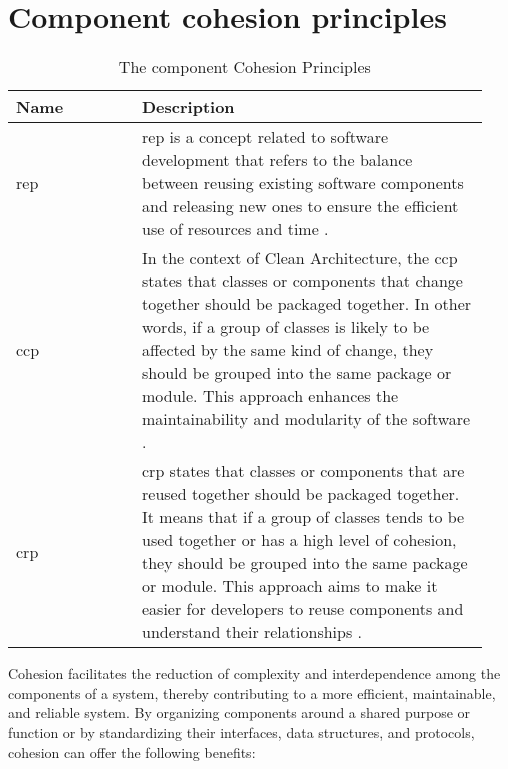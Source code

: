 \chapter{Component cohesion principles} \label{appendix_cohesion_principles}

\begin{table}[H]
    \small
    \begin{tabular}{ P{0.25\linewidth} | p{0.69\linewidth}} 
        \hline
        \textbf{Name} & \textbf{Description} \\ \hline
        \acrlong{rep} & \acrshort{rep} is a concept related to software development that
        refers to the balance between reusing existing software components and releasing
        new ones to ensure the efficient use of resources and time
        \parencite[104]{robert_c_martin_clean_2018}.\\ \midrule 
        
        \acrlong{ccp} & In the context of Clean Architecture, the \acrshort{ccp} states
        that classes or components that change together should be packaged together. In
        other words, if a group of classes is likely to be affected by the same kind of
        change, they should be grouped into the same package or module. This approach
        enhances the maintainability and modularity of the software
        \parencite[105]{robert_c_martin_clean_2018}.\\ \midrule 
        
        \acrlong{crp} & \acrshort{crp} states that classes or components that are reused
        together should be packaged together. It means that if a group of classes tends to
        be used together or has a high level of cohesion, they should be grouped into the
        same package or module. This approach aims to make it easier for developers to
        reuse components and understand their relationships
        \parencite[107]{robert_c_martin_clean_2018}.\\

        \bottomrule
    \end{tabular}
    \caption{The component Cohesion Principles}
    \label{appendix_tab_cohesion_principles}
\end{table}

Cohesion facilitates the reduction of complexity and interdependence among the components
of a system, thereby contributing to a more efficient, maintainable, and reliable system.
By organizing components around a shared purpose or function or by standardizing their
interfaces, data structures, and protocols, cohesion can offer the following benefits:

